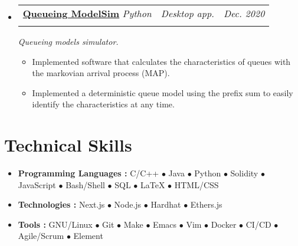 \documentclass[letterpaper, 11pt]{article}
\makeatletter
\newcommand{\project}[7] {
  \vspace{-1pt}\item
  \begin{tabular*}{0.97\textwidth}[t]{ll@{\extracolsep{\fill}}r}
    #1 \href{#4}{\textbf{\color{RoyalBlue}#2}}
    \textbar{} \textit{\small#5} \textbar{ } & \textit{\footnotesize#7} & \textit{\small #3} \\
    \vspace{-10pt}
  \end{tabular*}
  \textit{\small #6}
  \vspace{-8pt}
}
\newcommand{\subproject}[1] {
\item\small
  {#1}
  \vspace{-2pt}
}
\newcommand{\technicalskill}[3] {
  \vspace{-1pt}
\item\small
  #1 \textbf{#2 : }{\footnotesize{#3}}
  \vspace{-2pt}
}
\newcommand{\bulletitem}[1] {{\tiny$\bullet$} #1}
\makeatother
\begin{document}
\begin{itemize}[leftmargin=*]
  \project
  {\faIcon{user-clock}}
  {Queueing ModelSim}{Dec. 2020}
  {https://github.com/AbdeltwabMF/Queueing-ModelSim}{Python}
  {Queueing models simulator.}{Desktop app.}

  \begin{itemize}
    \subproject
    {Implemented software that calculates the characteristics of queues with the markovian arrival process (MAP).}
    \subproject
    {Implemented a deterministic queue model using the prefix sum to easily identify the characteristics at any time.}
  \end{itemize}\vspace{-4pt}
\end{itemize}

\section{Technical Skills}
\begin{itemize}[leftmargin=*]
  \technicalskill
  {}{Programming Languages}
  {C/C++ \bulletitem{Java} \bulletitem{Python} \bulletitem{Solidity} \bulletitem{JavaScript} \bulletitem{Bash/Shell} \bulletitem{SQL} \bulletitem{\LaTeX{}} \bulletitem{HTML/CSS}}

  \technicalskill
  {}{Technologies}
  {Next.js \bulletitem{Node.js} \bulletitem{Hardhat} \bulletitem{Ethers.js}}

  \technicalskill
  {}{Tools}
  {GNU/Linux \bulletitem{Git} \bulletitem{Make} \bulletitem{Emacs} \bulletitem{Vim} \bulletitem{Docker} \bulletitem{CI/CD} \bulletitem{Agile/Scrum} \bulletitem{Element}}
\end{itemize}
\end{document}
